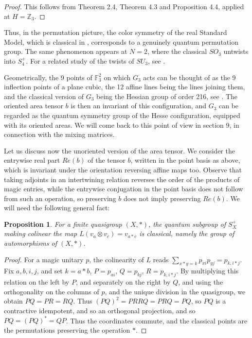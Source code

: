 \documentclass[11pt]{amsart}
\newtheorem{proposition}[theorem]{Proposition}
\theoremstyle{definition}
\begin{document}
\begin{proof}
This follows from Theorem 2.4, Theorem 4.3 and Proposition 4.4, applied at $H=\mathbb Z_3$.
\end{proof}

Thus, in the permutation picture, the color symmetry of the real Standard Model, which is classical in \cite{bdd}, corresponds to a genuinely quantum permutation group. The same phenomenon appears at $N=2$, where the classical $SO_3$ untwists into $S_4^+$. For a related study of the twists of $SU_3$, see \cite{by}.

Geometrically, the 9 points of $\mathbb F_3^2$ on which $G_3$ acts can be thought of as the 9 inflection points of a plane cubic, the 12 affine lines being the lines joining them, and the classical version of $G_3$ being the Hessian group of order 216, see \cite{ado}. The oriented area tensor $b$ is then an invariant of this configuration, and $G_3$ can be regarded as the quantum symmetry group of the Hesse configuration, equipped with its oriented areas. We will come back to this point of view in section 9, in connection with the mixing matrices.

Let us discuss now the unoriented version of the area tensor. We consider the entrywise real part $Re(b)$ of the tensor $b$, written in the point basis as above, which is invariant under the orientation reversing affine maps too. Observe that taking adjoints in an intertwining relation reverses the order of the products of magic entries, while the entrywise conjugation in the point basis does not follow from such an operation, so preserving $b$ does not imply preserving $Re(b)$. We will need the following general fact:

\begin{proposition}
For a finite quasigroup $(X,*)$, the quantum subgroup of $S_X^+$ making colinear the map $L(v_a\otimes v_c)=v_{a*c}$ is classical, namely the group of automorphisms of $(X,*)$.
\end{proposition}

\begin{proof}
For a magic unitary $p$, the colinearity of $L$ reads $\sum_{x*y=k}p_{xi}p_{yj}=p_{k,i*j}$. Fix $a,b,i,j$, and set $k=a*b$, $P=p_{ai}$, $Q=p_{bj}$, $R=p_{k,i*j}$. By multiplying this relation on the left by $P$, and separately on the right by $Q$, and using the orthogonality on the columns of $p$, and the unique division in the quasigroup, we obtain $PQ=PR=RQ$. Thus $(PQ)^2=PRRQ=PRQ=PQ$, so $PQ$ is a contractive idempotent, and so an orthogonal projection, and so $PQ=(PQ)^*=QP$. Thus the coordinates commute, and the classical points are the permutations preserving the operation $*$.
\end{proof}
\end{document}
